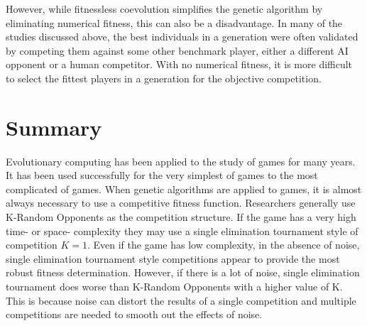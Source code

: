 However, while fitnessless coevolution simplifies the genetic algorithm by
eliminating numerical fitness, this can also be a disadvantage. In many of the
studies discussed above, the best individuals in a generation were often
validated by competing them against some other benchmark player, either a
different AI opponent or a human competitor. With no numerical fitness, it is
more difficult to select the fittest players in a generation for the objective
competition.

\section{Summary}

Evolutionary computing has been applied to the study of games for many years. It
has been used successfully for the very simplest of games to the most
complicated of games. When genetic algorithms are applied to games, it is almost
always necessary to use a competitive fitness function. Researchers generally
use K-Random Opponents as the competition structure. If the game has a very high
time- or space- complexity they may use a single elimination tournament
style of competition \(K=1\). Even if the game has low complexity, in the
absence of noise, single elimination tournament style competitions appear to
provide the most robust fitness determination. However, if there is a lot of
noise, single elimination tournament does worse than K-Random Opponents with a
higher value of K. This is because noise can distort the results of a single
competition and multiple competitions are needed to smooth out the effects of
noise.